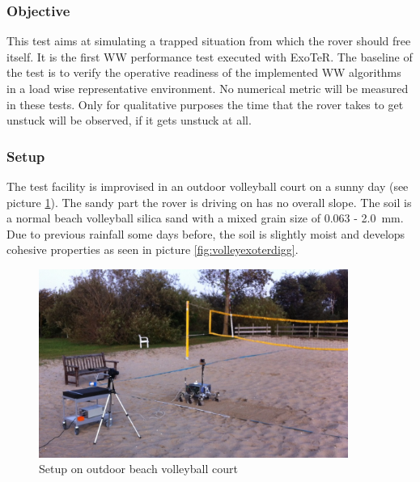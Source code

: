 \documentclass[a4paper,twocolumn]{esapub2005} %
\begin{document}
\subsubsection{Objective} This test aims at simulating a trapped situation
from which the rover should free itself. It is the first WW
performance test executed with ExoTeR. The baseline of the test is to verify
the operative readiness of the implemented WW algorithms in a load
wise representative environment.
No numerical metric will be measured in these tests. Only for qualitative purposes the time that the rover takes to get unstuck will be observed, if it gets unstuck at all.

\subsubsection{Setup} The test facility is improvised in an outdoor volleyball
court on a sunny day (see picture \ref{fig:volley}). The sandy part the rover
is driving on has no overall slope. The soil is a normal beach volleyball
silica sand with a mixed grain size of 0.063 - 2.0~\unit{mm}. Due to previous rainfall
some days before, the soil is slightly moist and develops cohesive properties
as seen in picture \ref{fig:volleyexoterdigg}. 

\begin{figure}[h!]
    \centering
    \includegraphics[width=0.9\textwidth]{volley.jpg}
    \caption{Setup on outdoor beach volleyball court}
    \label{fig:volley}
\end{figure}

\end{document}
